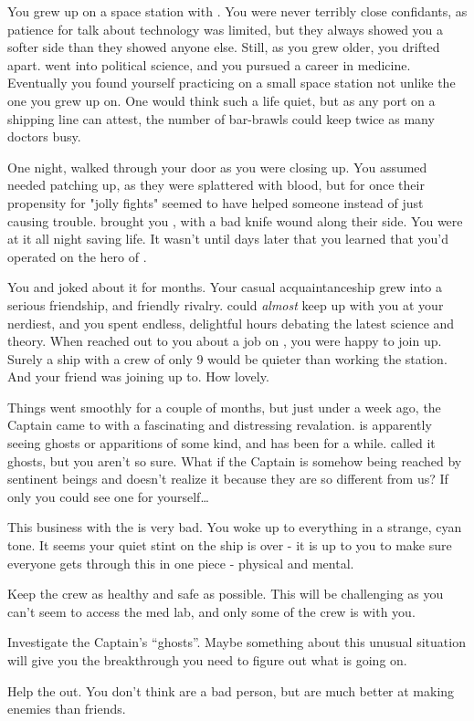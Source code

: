 \documentclass[char]{TMFHope}
\begin{document}
\name{\cMed{}}

You grew up on a space station with \cDip{}. You were never terribly close confidants, as \cDip{\their} patience for talk about technology was limited, but they always showed you a softer side than they showed anyone else. Still, as you grew older, you drifted apart. \cDip{} went into political science, and you pursued a career in medicine. Eventually you found yourself practicing on a small space station not unlike the one you grew up on. One would think such a life quiet, but as any port on a shipping line can attest, the number of bar-brawls could keep twice as many doctors busy.

One night, \cSci{} walked through your door as you were closing up. You assumed \cSci{\they} needed patching up, as they were splattered with blood, but for once their propensity for "jolly fights" seemed to have helped someone instead of just causing trouble. \cSci{\They} brought you \cCap{}, with a bad knife wound along their side. You were at it all night saving \cCap{\their} life. It wasn't until days later that you learned that you'd operated on the hero of \pBattle{}.

You and \cSci{} joked about it for months. Your casual acquaintanceship grew into a serious friendship, and friendly rivalry. \cSci{} could \emph{almost} keep up with you at your nerdiest, and you spent endless, delightful hours debating the latest science and theory. When \cCap{} reached out to you about a job on \pNew{}, you were happy to join up. Surely a ship with a crew of only 9 would be quieter than working the station. And your friend \cSci{} was joining up to. How lovely.

Things went smoothly for a couple of months, but just under a week ago, the Captain came to with a fascinating and distressing revalation. \cCap{} is apparently seeing ghosts or apparitions of some kind, and has been for a while. \cCap{\They} called it ghosts, but you aren't so sure. What if the Captain is somehow being reached by sentinent beings and doesn't realize it because they are so different from us? If only you could see one for yourself\ldots

This business with the \pNew{} is very bad. You woke up to everything in a strange, cyan tone. It seems your quiet stint on the ship is over - it is up to you to make sure everyone gets through this in one piece - physical and mental.

\begin{itemz}[Goals]
	\item Keep the crew as healthy and safe as possible. This will be challenging as you can't seem to access the med lab, and only some of the crew is with you.
	\item Investigate the Captain's ``ghosts''. Maybe something about this unusual situation will give you the breakthrough you need to figure out what is going on.
	\item Help the \cDip{} out. You don't think \cDip{\they} are a bad person, but \cDip{\they} are much better at making enemies than friends.
\end{itemz}
\end{document}
